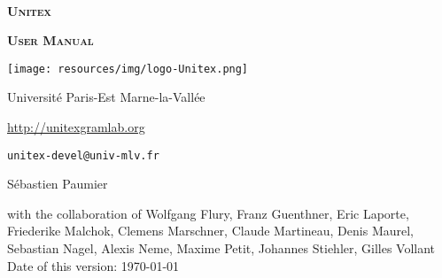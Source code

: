 
\begin{titlepage}
\begin{center}

~

\vspace{3cm}
\Huge
\textsc{\textbf{Unitex \UnitexVersion{}}}

\vspace{1cm}

\huge
\textsc{\textbf{User Manual}}

\vspace{2cm}

  \begin{center}
    \texttt{[image: resources/img/logo-Unitex.png]}
  \end{center}
\normalsize

\vspace{2cm}

\LARGE

Université Paris-Est Marne-la-Vallée
\bigskip
\normalsize

\url{http://unitexgramlab.org}

\verb$unitex-devel@univ-mlv.fr$

\vspace{0.5cm}

Sébastien Paumier
\bigskip

with the collaboration of Wolfgang Flury, Franz Guenthner, Eric Laporte,\\
Friederike Malchok, Clemens Marschner, Claude Martineau, Denis Maurel,\\
Sebastian Nagel, Alexis Neme, Maxime Petit, Johannes Stiehler, Gilles Vollant\\

\bigskip
\mydate
Date of this version: \today
\end{center}

\end{titlepage}
